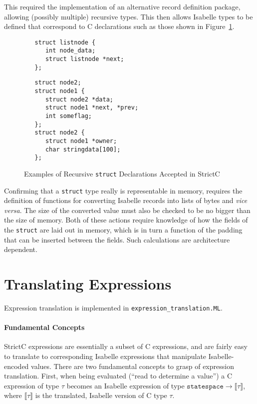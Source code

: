\documentclass{article}
\newcommand{\strictc}{\textsf{StrictC}}
\newcommand{\MLsuffix}{.ML}
\newcommand{\srcfile}[1]{\texttt{#1}}
\newcommand{\MLfile}[1]{\srcfile{#1\MLsuffix}}
\newcommand{\Sem}[1]{\ensuremath{\llbracket#1\rrbracket}}
\begin{document}
This required the implementation of an alternative record definition
package, allowing (possibly multiple) recursive types.  This then
allows Isabelle types to be defined that correspond to C declarations
such as those shown in Figure~\ref{fig:struct-examples}.

\begin{figure}
\begin{minipage}[t]{0.4\textwidth}
\begin{verbatim}
   struct listnode {
      int node_data;
      struct listnode *next;
   };
\end{verbatim}
\end{minipage}
\qquad\quad
\begin{minipage}[t]{0.4\textwidth}
\begin{verbatim}
   struct node2;
   struct node1 {
      struct node2 *data;
      struct node1 *next, *prev;
      int someflag;
   };
   struct node2 {
      struct node1 *owner;
      char stringdata[100];
   };
\end{verbatim}
\end{minipage}
\caption{Examples of Recursive \texttt{struct} Declarations Accepted
  in \strictc}
\label{fig:struct-examples}
\end{figure}

Confirming that a \texttt{struct} type really is representable in
memory, requires the definition of functions for converting Isabelle
records into lists of bytes and \emph{vice versa}.  The size of the
converted value must also be checked to be no bigger than the size of
memory.  Both of these actions require knowledge of how the fields of
the \texttt{struct} are laid out in memory, which is in turn a
function of the padding that can be inserted between the fields.  Such
calculations are architecture dependent.


\section{Translating Expressions}
\label{sec:expressions}

Expression translation is implemented in
\MLfile{expression\_translation}.

\paragraph{Fundamental Concepts}
\strictc{} expressions are essentially a subset of C expressions, and
are fairly easy to translate to corresponding Isabelle expressions
that manipulate Isabelle-encoded values.  There are two fundamental
concepts to grasp of expression translation.  First, when being
evaluated (``read to determine a value'') a C expression of type
$\tau$ becomes an Isabelle expression of type $\texttt{statespace}
\rightarrow \Sem{\tau}$, where $\Sem{\tau}$ is the translated,
Isabelle version of C type $\tau$.
\end{document}
